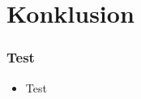 \section{Konklusion}
	\begin{frame}
		\frametitle{Test}
	\begin{itemize}
		\item Test
	\end{itemize}
\end{frame}
